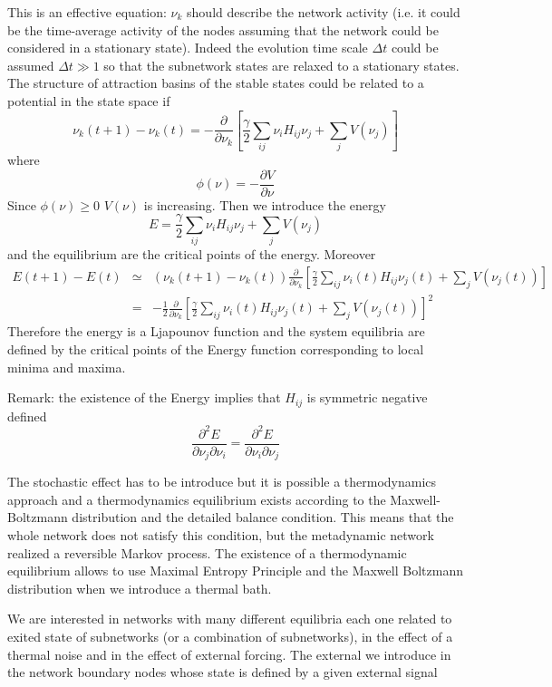 This is an effective equation: $\nu_k$ should describe the network activity (i.e. it could be the time-average activity of the nodes
assuming that the network could be considered in a stationary state). Indeed the evolution time scale $\Delta t$ could be assumed
$\Delta t\gg 1$ so that the subnetwork states are relaxed to a stationary states. 
The structure of attraction basins of the stable states could be related to a potential in the state space if
$$
\nu_k(t+1)-\nu_k(t)=-\frac{\partial }{\partial \nu_k}\left [ \frac{\gamma}{2} \sum_{ij}\nu_i H_{ij}\nu_j+\sum_j V(\nu_j)\right ]
$$
where 
$$
\phi(\nu)=-\frac{\partial V}{\partial \nu}
$$
Since $\phi(\nu)\ge 0$ $V(\nu)$ is increasing. Then we introduce the energy
$$
E=\frac{\gamma}{2} \sum_{ij}\nu_i H_{ij}\nu_j+\sum_j V(\nu_j)
$$
and the equilibrium are the critical points of the energy. Moreover 
\begin{eqnarray}
E(t+1)-E(t)&\simeq& (\nu_k(t+1)-\nu_k(t))\frac{\partial}{\partial \nu_k}\left [\frac{\gamma}{2} \sum_{ij}\nu_i(t) H_{ij}\nu_j(t)+\sum_j V(\nu_j(t))\right ]\nonumber \\
&=& -\frac{1}{2}\frac{\partial}{\partial \nu_k}\left [ \frac{\gamma}{2} \sum_{ij}\nu_i(t) H_{ij}\nu_j(t)+\sum_j V(\nu_j(t)) \right ]^2\nonumber
\end{eqnarray}
Therefore the energy is a Ljapounov function and the system equilibria are defined by the critical points of the Energy function
corresponding to local minima and maxima.\par\noindent
Remark: the existence of the Energy implies that $H_{ij}$ is symmetric negative defined
$$
\frac{\partial^2 E}{\partial \nu_j \partial \nu_i}=\frac{\partial^2 E}{\partial \nu_i \partial \nu_j}
$$
\par\noindent
The stochastic effect has to be introduce but it is possible a thermodynamics approach and a thermodynamics equilibrium exists
according to the Maxwell-Boltzmann distribution and the detailed balance condition. This means that the whole network does not
satisfy this condition, but the metadynamic network realized a reversible Markov process. The existence of a thermodynamic equilibrium
allows to use Maximal Entropy Principle and the Maxwell Boltzmann distribution when we introduce a thermal bath. 
\par\noindent
We are interested in networks with many different equilibria each one related to exited state of subnetworks (or a combination of subnetworks), 
in the effect of a thermal noise and in the effect of external forcing. The external  we introduce in the network boundary nodes whose state is defined by a given external signal
